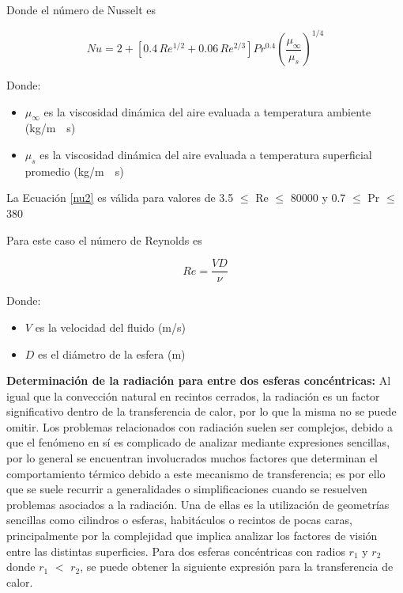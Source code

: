 Donde el número de Nusselt es

\begin{equation}\label{nu2}
    Nu=2+\left [ 0.4\, Re^{1/2}+0.06\,Re^{2/3} \right ]Pr^{0.4}\left ( \frac{\mu _{\infty }}{\mu_{s}} \right )^{1/4}
\end{equation}

Donde:

\begin{itemize}
    \item $\mu _{\infty}$ es la viscosidad dinámica del aire evaluada a temperatura ambiente (\si{\kilo\gram/\meter\cdot\second}) 
    \item $\mu_{s}$ es la viscosidad dinámica del aire evaluada a temperatura superficial promedio (\si{\kilo\gram/\meter\cdot\second})
\end{itemize}

La Ecuación \ref{nu2} es válida para valores de 3.5 $\leq$ Re $\leq$ 80000 y 0.7 $\leq$ Pr $\leq$ 380

Para este caso el número de Reynolds es

\begin{equation}\label{re2}
    Re=\frac{VD}{\nu }
\end{equation}

Donde:

\begin{itemize}
    \item $V$ es la velocidad del fluido (\si{\meter/\second}) 
    \item $D$ es el diámetro de la esfera (\si{\meter})
\end{itemize}

\textbf{Determinación de la radiación para entre dos esferas concéntricas:} Al igual que la convección natural en recintos cerrados, la radiación es un factor significativo dentro de la transferencia de calor, por lo que la misma no se puede omitir. Los problemas relacionados con radiación suelen ser complejos, debido a que el fenómeno en sí es complicado de analizar mediante expresiones sencillas, por lo general se encuentran involucrados muchos factores que determinan el comportamiento térmico debido a este mecanismo de transferencia; es por ello que se suele recurrir a generalidades o simplificaciones cuando se resuelven problemas asociados a la radiación. Una de ellas es la utilización de geometrías sencillas como cilindros o esferas, habitáculos o recintos de pocas caras, principalmente por la complejidad que implica analizar los factores de visión entre las distintas superficies. Para  dos esferas concéntricas con radios $r_{1}$ y $r_{2}$ donde $r_{1}$ $<$ $r_{2}$, se puede obtener la siguiente expresión para la transferencia de calor.\cite{cengel}

